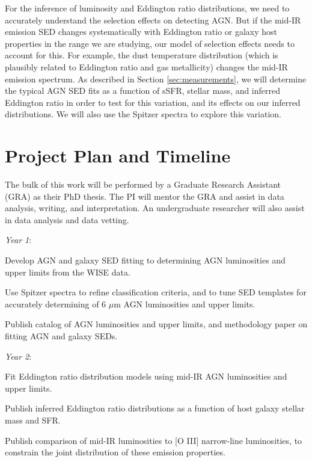 \documentclass[12pt, preprint]{hacked-aastex}
\newlength{\mylen}
\newenvironment{ditemize}
{ \begin{list}{}{%
\setlength{\topsep}{0pt}%
\setlength{\partopsep}{3pt}%
\setlength{\itemsep}{1pt}\setlength{\parsep}{1pt}%
\setlength{\itemindent}{0pt}\setlength{\listparindent}{12pt}%
\setlength{\leftmargin}{24pt}\setlength{\rightmargin}{0in}%
\setlength{\labelsep}{3pt}\setlength{\labelwidth}{6pt}%
\setlength{\mylen}{3pt}
\renewcommand{\makelabel}{\makebox[\labelwidth][l]{\raisebox{\mylen}{\tiny$\bullet$}\hspace{\fill}}}}}
{\end{list}}
\begin{document}
For the inference of luminosity and Eddington ratio distributions, we
need to accurately understand the selection effects on detecting
AGN. But if the mid-IR emission SED changes systematically with
Eddington ratio or galaxy host properties in the range we are
studying, our model of selection effects needs to account for
this. For example, the dust temperature distribution (which is
plausibly related to Eddington ratio and gas metallicity) changes the
mid-IR emission spectrum. As described in Section
\ref{sec:measurements}, we will determine the typical AGN SED fits as
a function of sSFR, stellar mass, and inferred Eddington ratio in
order to test for this variation, and its effects on our inferred
distributions.  We will also use the Spitzer spectra to explore this
variation.

\section{Project Plan and Timeline\label{sec:plan}}

The bulk of this work will be performed by a Graduate Research
Assistant (GRA) as their PhD thesis.  The PI will mentor the GRA and 
assist in data analysis, writing, and interpretation. An undergraduate
researcher will also assist in data analysis and data vetting.

\begin{ditemize}
\item {\it Year 1}: 
\begin{ditemize}
\item Develop AGN and galaxy SED fitting to determining AGN
  luminosities and upper limits from the WISE data.
\item Use Spitzer spectra to refine classification criteria, and to
  tune SED templates for accurately determining of 6 $\mu$m AGN
  luminosities and upper limits.
\item Publish catalog of AGN luminosities and upper limits, and
  methodology paper on fitting AGN and galaxy SEDs.
\end{ditemize}
\item {\it Year 2}: 
\begin{ditemize}
\item Fit Eddington ratio distribution models using mid-IR AGN
  luminosities and upper limits.
\item Publish inferred Eddington ratio distributions as a function of
  host galaxy stellar mass and SFR.
\item Publish comparison of mid-IR luminosities to [O III] narrow-line
  luminosities, to constrain the joint distribution of these emission
  properties. 
\end{ditemize}
\end{ditemize}
\end{document}
